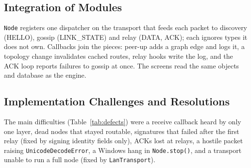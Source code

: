 

\subsection{Integration of Modules}
\texttt{Node} registers one dispatcher on the transport that feeds each packet to discovery (HELLO), gossip (LINK\_STATE) and relay (DATA, ACK); each ignores types it does not own. Callbacks join the pieces: peer-up adds a graph edge and logs it, a topology change invalidates cached routes, relay hooks write the log, and the ACK loop reports failures to gossip at once. The screens read the same objects and database as the engine.

\subsection{Implementation Challenges and Resolutions}
The main difficulties (Table~\ref{tab:defects}) were a receive callback heard by only one layer, dead nodes that stayed routable, signatures that failed after the first relay (fixed by signing identity fields only), ACKs lost at relays, a hostile packet raising \texttt{UnicodeDecodeError}, a Windows hang in \texttt{Node.stop()}, and a transport unable to run a full node (fixed by \texttt{LanTransport}).
